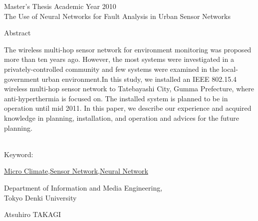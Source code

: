 \begin{center}
\LARGE{Master's Thesis Academic Year 2010}\\

\vspace{10mm}
\LARGE{The Use of Neural Networks for Fault Analysis in Urban Sensor Networks}\\
\end{center}
\begin{center}
Abstract\\
\end{center}
The wireless multi-hop sensor network for environment monitoring was proposed more than ten years ago. However, the most systems were investigated in a privately-controlled community and few systems were examined in the local-government urban environment.In this study, we installed an IEEE 802.15.4 wireless multi-hop sensor network to Tatebayashi City, Gumma Prefecture, where anti-hyperthermia is focused on. The installed system is planned to be in operation until mid 2011. In this paper, we describe our experience and acquired knowledge in planning, installation, and operation and advices for the future planning.
\\\\

\begin{flushleft}Keyword:\\
\end{flushleft}
{\underline{Micro Climate},\underline{Sensor Network},\underline{Neural Network}}

\begin{flushright}
\vspace{10mm}

\vspace{5mm}
\large Department of Information and Media Engineering,\\
Tokyo Denki University\\
\begin{flushright}\LARGE Atsuhiro TAKAGI\\
\end{flushright}

\end{flushright}
